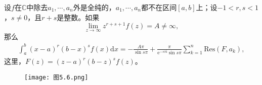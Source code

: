 \documentclass[../../main.tex]{subfiles}
\begin{document}
\begin{theorem}\label{theorem:定理5.5.14}
设\( f \)在\( \mathbb{C} \)中除去\( a_1, \cdots, a_n \)外是全纯的，\( a_1, \cdots, a_n \)都不在区间\([a, b]\)上；设\( -1 < r, s < 1 \)，\( s \neq 0 \)，且\( r + s \)是整数。如果
\[
\lim_{z \to \infty} z^{r + s + 1} f(z) = A \neq \infty,
\]
那么
\begin{align}
\int_{a}^{b} (x - a)^r (b - x)^s f(x) \mathrm{d}x
= -\frac{A\pi}{\sin s\pi} + \frac{\pi}{\mathrm{e}^{-s\pi \mathrm{i}} \sin s\pi} \sum_{k = 1}^{n} \mathrm{Res}(F, a_k), \label{thm5.5.14_eq}
\end{align}
这里，\( F(z) = (z - a)^r (b - z)^s f(z) \)。
\end{theorem}
\begin{figure}[H]
\centering
\texttt{[image: 图5.6.png]}
\caption{}
\label{figure:图5.6}
\end{figure}
\end{document}
